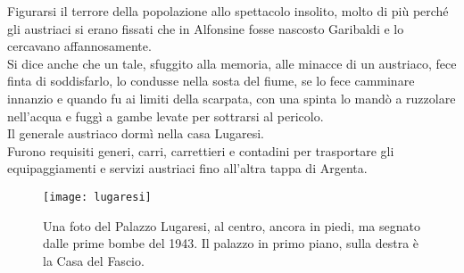 \indent Figurarsi il terrore della popolazione allo spettacolo insolito, molto di più perché gli austriaci si erano fissati che in Alfonsine fosse nascosto Garibaldi e lo cercavano affannosamente. \\
\indent Si dice anche che un tale, sfuggito alla memoria, alle minacce di un austriaco, fece finta di soddisfarlo, lo condusse nella sosta del fiume, se lo fece camminare innanzio e quando fu ai limiti della scarpata, con una spinta lo mandò a ruzzolare nell'acqua e fuggì a gambe levate per sottrarsi al pericolo.\\
\indent Il generale austriaco dormì nella casa Lugaresi.\\
\indent Furono requisiti generi, carri, carrettieri e contadini per trasportare gli equipaggiamenti e servizi austriaci fino all'altra tappa di Argenta.

 \begin{figure}[htb]
    \centering
    \vspace{-0.5cm}
    \texttt{[image: lugaresi]}
    \caption*{Una foto del Palazzo Lugaresi, al centro, ancora in piedi, ma segnato dalle prime bombe del 1943. Il palazzo in primo piano, sulla destra è la Casa del Fascio.\label{fig:lugaresi}}
    \vspace{-0.5cm}
\end{figure}


